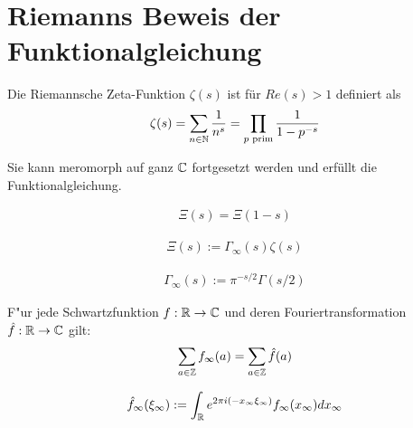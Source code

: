 \section{Riemanns Beweis der Funktionalgleichung}
\label{sec:riemann2}
	\begin{defi}
		\label{def:zeta}
		Die Riemannsche Zeta-Funktion $\zeta(s)$  ist für $Re(s)>1$ definiert als
		\begin{align}
			\zeta (s) = \sum_{n\in \mathbb{N}} \frac{1}{n^s} = \prod_{p \text{ prim}} \frac{1}{1-p^{-s}}
		\end{align}
	\end{defi}
	Sie kann meromorph auf ganz $\mathbb{C}$ fortgesetzt werden und erfüllt die Funktionalgleichung.
	\begin{satz}
		\label{eq:funktionalgleichung}
		\begin{align}
			 \Xi(s) = \Xi(1-s)
		\end{align}
	\end{satz}


	\begin{defi}
		\label{def:xi}
		\begin{align}
			\Xi(s) := \Gamma_\infty(s) \zeta(s)
		\end{align}
	\end{defi}



	\begin{defi}
		\label{def:gamma_infty}
		\begin{align}
			\Gamma_\infty(s) := \pi^{-s/2} \Gamma(s/2)
		\end{align}
	\end{defi}

	\begin{satz}
		\label{satz:poisson}
		F"ur jede Schwartzfunktion $f:\mathbb{R} \to \mathbb{C}$ und deren Fouriertransformation $\hat{f}:\mathbb{R} \to \mathbb{C}$ gilt:
		\begin{align}
			\sum_{a \in \mathbb{Z}} f_\infty (a) = \sum_{a \in \mathbb{Z}} \hat{f}(a)
		\end{align}
	\end{satz}

	\begin{defi}
		\label{def:fourier}
		
		\begin{align}
			\hat{f}_\infty(\xi_\infty) := \int_{\mathbb{R}}{e^{ 2\pi i (-x_\infty\xi_\infty) }f_\infty(x_\infty)dx_\infty}
		\end{align}
	\end{defi}
	
